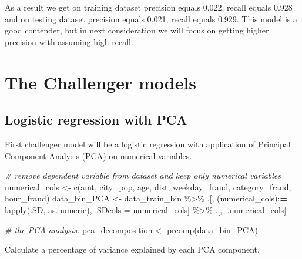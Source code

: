 \documentclass[
]{report}
\newenvironment{Shaded}{\begin{snugshade}}{\end{snugshade}}
\newcommand{\CommentTok}[1]{\textcolor[rgb]{0.56,0.35,0.01}{\textit{#1}}}
\newcommand{\ErrorTok}[1]{\textcolor[rgb]{0.64,0.00,0.00}{\textbf{#1}}}
\newcommand{\FunctionTok}[1]{\textcolor[rgb]{0.00,0.00,0.00}{#1}}
\newcommand{\NormalTok}[1]{#1}
\newcommand{\OtherTok}[1]{\textcolor[rgb]{0.56,0.35,0.01}{#1}}
\newcommand{\SpecialCharTok}[1]{\textcolor[rgb]{0.00,0.00,0.00}{#1}}
\newcommand{\StringTok}[1]{\textcolor[rgb]{0.31,0.60,0.02}{#1}}
\begin{document}
As a result we get on training dataset precision equals 0.022, recall
equals 0.928 and on testing dataset precision equals 0.021, recall
equals 0.929. This model is a good contender, but in next consideration
we will focus on getting higher precision with assuming high recall.

\hypertarget{the-challenger-models}{%
\section{The Challenger models}\label{the-challenger-models}}

\hypertarget{logistic-regression-with-pca}{%
\subsection{Logistic regression with
PCA}\label{logistic-regression-with-pca}}

First challenger model will be a logistic regression with application of
Principal Component Analysis (PCA) on numerical variables.

\begin{Shaded}
\begin{Highlighting}[]
\CommentTok{\# remove dependent variable from dataset and keep only numerical variables}
\NormalTok{numerical\_cols }\OtherTok{\textless{}{-}} \FunctionTok{c}\NormalTok{(}\StringTok{\textquotesingle{}amt\textquotesingle{}}\NormalTok{, }\StringTok{\textquotesingle{}city\_pop\textquotesingle{}}\NormalTok{, }\StringTok{\textquotesingle{}age\textquotesingle{}}\NormalTok{, }\StringTok{\textquotesingle{}dist\textquotesingle{}}\NormalTok{, }\StringTok{\textquotesingle{}weekday\_fraud\textquotesingle{}}\NormalTok{, }\StringTok{\textquotesingle{}category\_fraud\textquotesingle{}}\NormalTok{, }\StringTok{\textquotesingle{}hour\_fraud\textquotesingle{}}\NormalTok{)}
\NormalTok{data\_bin\_PCA }\OtherTok{\textless{}{-}}\NormalTok{ data\_train\_bin }\SpecialCharTok{\%\textgreater{}\%} 
\NormalTok{  .[, (numerical\_cols)}\SpecialCharTok{:}\ErrorTok{=} \FunctionTok{lapply}\NormalTok{(.SD, as.numeric), .SDcols }\OtherTok{=}\NormalTok{ numerical\_cols] }\SpecialCharTok{\%\textgreater{}\%}
\NormalTok{  .[, ..numerical\_cols]}

\CommentTok{\# the PCA analysis:}
\NormalTok{pca\_decomposition }\OtherTok{\textless{}{-}} \FunctionTok{prcomp}\NormalTok{(data\_bin\_PCA)}
\end{Highlighting}
\end{Shaded}

Calculate a percentage of variance explained by each PCA component.
\end{document}
